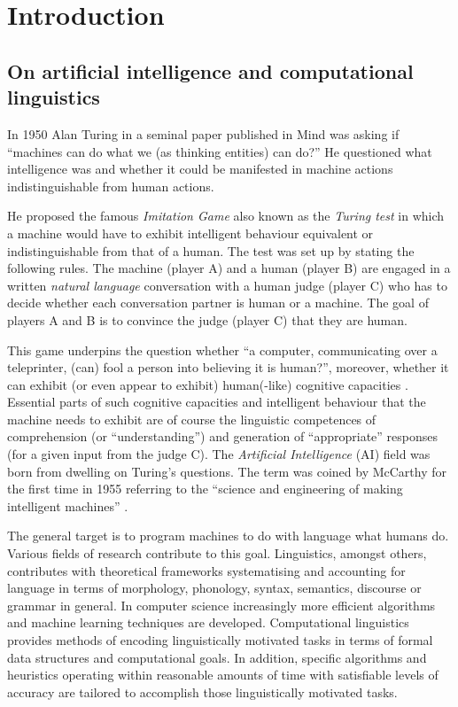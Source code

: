 \chapter{Introduction}
\label{ch:introduction}

\section{On artificial intelligence and computational linguistics}
In 1950 Alan Turing in a seminal paper \citep{Turing1950} published in Mind was asking if ``machines can do what we (as thinking entities) can do?'' He questioned what intelligence was and whether it could be manifested in machine actions indistinguishable from human actions. 

He proposed the famous \textit{Imitation Game} also known as the \textit{Turing test} in which a machine would have to exhibit intelligent behaviour equivalent or indistinguishable from that of a human. The test was set up by stating the following rules. The machine (player A) and a human (player B) are engaged in a written \textit{natural language} conversation with a human judge (player C) who has to decide whether each conversation partner is human or a machine. The goal of players A and B is to convince the judge (player C) that they are human. 

This game underpins the question whether ``a computer, communicating over a teleprinter, (can) fool a person into believing it is human?'', moreover, whether it can exhibit (or even appear to exhibit) human(-like) cognitive capacities \citep{Harnad1992}. Essential parts of such cognitive capacities and intelligent behaviour that the machine needs to exhibit are of course the linguistic competences of comprehension (or ``understanding'') and generation of ``appropriate'' responses (for a given input from the judge C). The \textit{Artificial Intelligence} (AI) field was born from dwelling on Turing's questions. The term was coined by McCarthy for the first time in 1955 referring to the ``science and engineering of making intelligent machines'' \citep{McCarthy1955}.

The general target is to program machines to do with language what humans do. Various fields of research contribute to this goal. Linguistics, amongst others, contributes with theoretical frameworks systematising and accounting for language in terms of morphology, phonology, syntax, semantics, discourse or grammar in general. In computer science increasingly more efficient algorithms and machine learning techniques are developed. Computational linguistics provides methods of encoding linguistically motivated tasks in terms of formal data structures and computational goals. In addition, specific algorithms and heuristics operating within reasonable amounts of time with satisfiable levels of accuracy are tailored to accomplish those linguistically motivated tasks.

